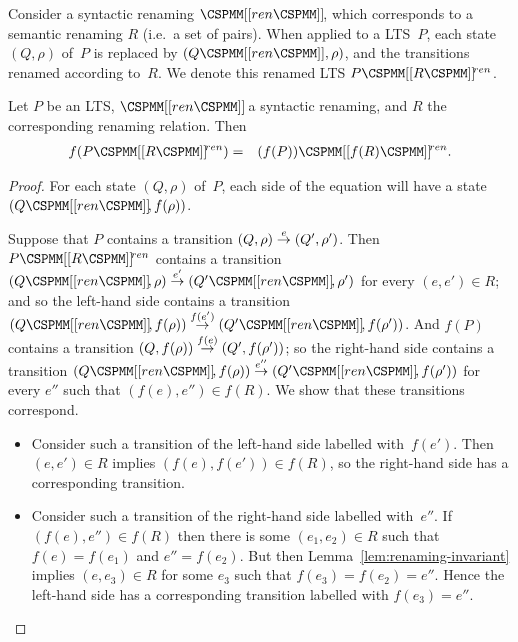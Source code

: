  

Consider a syntactic renaming $\rename{ren}$, which corresponds to a
semantic renaming $R$ (i.e.~a set of pairs).  When applied to a LTS~$P$, each
state $(Q,\rho)$ of~$P$ is replaced by $(Q\M{[[}ren\M{]]}, \rho)$, and the
transitions renamed according to~$R$.  We denote this renamed LTS
$P\rename{R}^{ren}$.
%
\begin{lemma}
\label{lem:renaming-f}
Let $P$ be an LTS, $\rename{ren}$ a syntactic renaming, and $R$ the
corresponding renaming relation.  Then
%
\begin{eqnarray*}
f(P\rename{R}^{ren}) & = & (f(P))\rename{f(R)}^{ren}.
\end{eqnarray*}
%
\end{lemma}


\begin{proof}
For each state $(Q,\rho)$ of~$P$, each side of the equation will have a
state $(Q\rename{ren}, f(\rho))$.


Suppose that $P$ contains a transition $(Q,\rho) \stackrel{e}{\rightarrow} (Q',\rho')$.  Then
$P\rename{R}^{ren}$ contains a transition $(Q\rename{ren},\rho) \trans{e'}
(Q'\rename{ren},\rho')$ for every $(e,e') \in R$; and so the left-hand side
contains a transition $(Q\rename{ren}, f(\rho)) \trans{f(e')}
(Q'\rename{ren}, {f(\rho')})$.  And $f(P)$ contains a transition $(Q,
f(\rho)) \stackrel{f(e)}{\rightarrow} (Q', f(\rho'))$; so the right-hand side contains
a transition $(Q\rename{ren}, f(\rho)) \trans{e''} (Q'\rename{ren},
{f(\rho')})$ for every $e''$ such that $(f(e), e'') \in f(R)$.  We show
that these transitions correspond.
%
\begin{itemize}
\item Consider such a transition of the left-hand side labelled with~$f(e')$.
Then $(e,e') \in R$ implies $(f(e),f(e')) \in f(R)$, so the right-hand side
  has a corresponding transition.

\item Consider such a transition of the right-hand side labelled with~$e''$.
  If $(f(e), e'') \in f(R)$ then there is some $(e_1,e_2) \in R$ such that
  $f(e) = f(e_1)$ and $e'' = f(e_2)$.  But then
  Lemma~\ref{lem:renaming-invariant} implies $(e,e_3) \in R$ for some $e_3$
  such that $f(e_3) = f(e_2) = e''$.  Hence the left-hand side has a
  corresponding transition labelled with $f(e_3) = e''$.
\end{itemize}
\end{proof}

